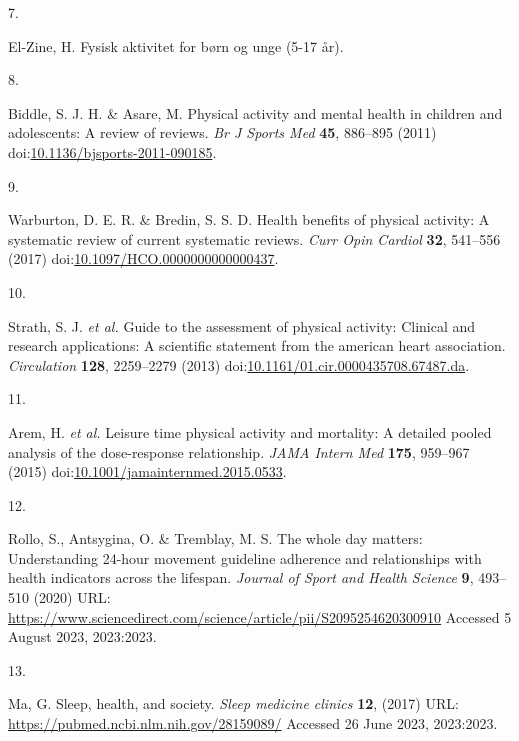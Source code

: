 \documentclass[
  10pt,
]{scrbook}
\newlength{\cslhangindent}
\newlength{\csllabelwidth}
\newlength{\cslentryspacingunit} %
\newenvironment{CSLReferences}[2] %
 {%
  \setlength{\parindent}{0pt}
  \ifodd #1
  \let\oldpar\par
  \def\par{\hangindent=\cslhangindent\oldpar}
  \fi
  \setlength{\parskip}{#2\cslentryspacingunit}
 }%
 {}
\newcommand{\CSLLeftMargin}[1]{\parbox[t]{\csllabelwidth}{#1}}
\newcommand{\CSLRightInline}[1]{\parbox[t]{\linewidth - \csllabelwidth}{#1}\break}
\begin{document}
\begin{CSLReferences}{0}{0}
\leavevmode{}%
\CSLLeftMargin{7. }%
\CSLRightInline{El-Zine, H. Fysisk aktivitet for børn og unge (5-17
år).}

\leavevmode{}%
\CSLLeftMargin{8. }%
\CSLRightInline{Biddle, S. J. H. \& Asare, M. Physical activity and
mental health in children and adolescents: A review of reviews. \emph{Br
J Sports Med} \textbf{45}, 886--895 (2011)
doi:\href{https://doi.org/10.1136/bjsports-2011-090185}{10.1136/bjsports-2011-090185}.}

\leavevmode{}%
\CSLLeftMargin{9. }%
\CSLRightInline{Warburton, D. E. R. \& Bredin, S. S. D. Health benefits
of physical activity: A systematic review of current systematic reviews.
\emph{Curr Opin Cardiol} \textbf{32}, 541--556 (2017)
doi:\href{https://doi.org/10.1097/HCO.0000000000000437}{10.1097/HCO.0000000000000437}.}

\leavevmode{}%
\CSLLeftMargin{10. }%
\CSLRightInline{Strath, S. J. \emph{et al.} Guide to the assessment of
physical activity: Clinical and research applications: A scientific
statement from the american heart association. \emph{Circulation}
\textbf{128}, 2259--2279 (2013)
doi:\href{https://doi.org/10.1161/01.cir.0000435708.67487.da}{10.1161/01.cir.0000435708.67487.da}.}

\leavevmode{}%
\CSLLeftMargin{11. }%
\CSLRightInline{Arem, H. \emph{et al.} Leisure time physical activity
and mortality: A detailed pooled analysis of the dose-response
relationship. \emph{{JAMA} Intern Med} \textbf{175}, 959--967 (2015)
doi:\href{https://doi.org/10.1001/jamainternmed.2015.0533}{10.1001/jamainternmed.2015.0533}.}

\leavevmode{}%
\CSLLeftMargin{12. }%
\CSLRightInline{Rollo, S., Antsygina, O. \& Tremblay, M. S. The whole
day matters: Understanding 24-hour movement guideline adherence and
relationships with health indicators across the lifespan. \emph{Journal
of Sport and Health Science} \textbf{9}, 493--510 (2020) URL:
\url{https://www.sciencedirect.com/science/article/pii/S2095254620300910}
Accessed 5 August 2023, 2023:2023.}

\leavevmode{}%
\CSLLeftMargin{13. }%
\CSLRightInline{Ma, G. Sleep, health, and society. \emph{Sleep medicine
clinics} \textbf{12}, (2017) URL:
\url{https://pubmed.ncbi.nlm.nih.gov/28159089/} Accessed 26 June 2023,
2023:2023.}


\end{CSLReferences}
\end{document}

